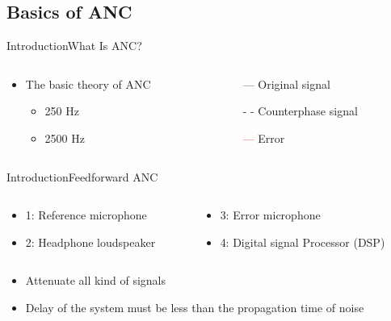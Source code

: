 \subsection{Basics of ANC}
\begin{frame}{Introduction}{What Is ANC?}
	\begin{columns}
		\begin{column}{0.5\textwidth}
				\begin{itemize}
					\item The basic theory of ANC
					\begin{itemize}
						\item  250 Hz
						\item 2500 Hz 
					\end{itemize}	
				\end{itemize}
			\vspace{-2.5mm}	
		\begin{center}
	 		
	 	\end{center}
		\end{column}
		\begin{column}{0.5\textwidth} 
			\begin{itemize}
				\item[\textcolor{MATLABblue}{---}] Original signal
				\item[\textcolor{MATLABblue}{- -}] Counterphase signal
				\item[\textcolor{red}{---}] Error
			\end{itemize}
		\begin{center}
	 		
	 	\end{center}
		\end{column}
	\end{columns}
\end{frame}

\begin{frame}{Introduction}{Feedforward ANC}
	\begin{columns}	
			\begin{column}{0.5\textwidth}
			\begin{itemize}
			\item 1: Reference microphone
			\item 2: Headphone loudspeaker
			\end{itemize}
			\end{column}		
	\begin{column}{0.5\textwidth} 
	\begin{itemize}
			\item 3: Error microphone
			\item 4: Digital signal Processor (DSP)
	\end{itemize}
	\end{column}	
	\end{columns}	
	
	\begin{itemize}
			\item Attenuate all kind of signals
			\item Delay of the system must be less than the propagation time of noise
	\end{itemize}		
\end{frame}

